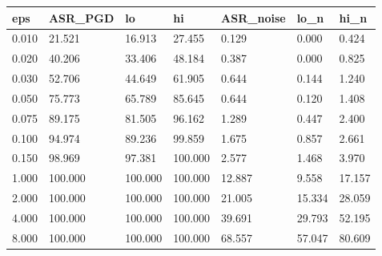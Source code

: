 \begin{tabular}{lllllll}
\hline
eps & ASR\_PGD & lo & hi & ASR\_noise & lo\_n & hi\_n \\
\hline
0.010 & 21.521 & 16.913 & 27.455 & 0.129 & 0.000 & 0.424 \\
0.020 & 40.206 & 33.406 & 48.184 & 0.387 & 0.000 & 0.825 \\
0.030 & 52.706 & 44.649 & 61.905 & 0.644 & 0.144 & 1.240 \\
0.050 & 75.773 & 65.789 & 85.645 & 0.644 & 0.120 & 1.408 \\
0.075 & 89.175 & 81.505 & 96.162 & 1.289 & 0.447 & 2.400 \\
0.100 & 94.974 & 89.236 & 99.859 & 1.675 & 0.857 & 2.661 \\
0.150 & 98.969 & 97.381 & 100.000 & 2.577 & 1.468 & 3.970 \\
1.000 & 100.000 & 100.000 & 100.000 & 12.887 & 9.558 & 17.157 \\
2.000 & 100.000 & 100.000 & 100.000 & 21.005 & 15.334 & 28.059 \\
4.000 & 100.000 & 100.000 & 100.000 & 39.691 & 29.793 & 52.195 \\
8.000 & 100.000 & 100.000 & 100.000 & 68.557 & 57.047 & 80.609 \\
\hline
\end{tabular}
